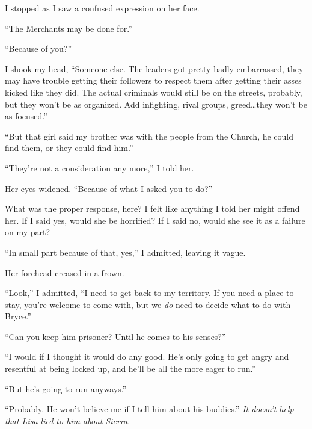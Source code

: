 I stopped as I saw a confused expression on her face.



``The Merchants may be done for.''



``Because of you?''



I shook my head, ``Someone else.  The leaders got pretty badly embarrassed, they may have trouble getting their followers to respect them after getting their asses kicked like they did.  The actual criminals would still be on the streets, probably, but they won't be as organized.  Add infighting, rival groups, greed\ldots they won't be as focused.''



``But that girl said my brother was with the people from the Church, he could find them, or they could find him.''



``They're not a consideration any more,'' I told her.



Her eyes widened.  ``Because of what I asked you to do?''



What was the proper response, here?  I felt like anything I told her might offend her.  If I said yes, would she be horrified?  If I said no, would she see it as a failure on my part?



``In small part because of that, yes,'' I admitted, leaving it vague.



Her forehead creased in a frown.



``Look,'' I admitted, ``I need to get back to my territory.  If you need a place to stay, you're welcome to come with, but we \emph{do} need to decide what to do with Bryce.''



``Can you keep him prisoner?  Until he comes to his senses?''



``I would if I thought it would do any good.  He's only going to get angry and resentful at being locked up, and he'll be all the more eager to run.''



``But he's going to run anyways.''



``Probably.  He won't believe me if I tell him about his buddies.''  \emph{It doesn't help that Lisa lied to him about Sierra}.



